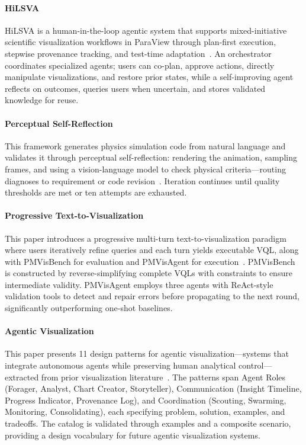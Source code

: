 \paragraph{HiLSVA}
HiLSVA is a human-in-the-loop agentic system that supports mixed-initiative scientific visualization workflows in ParaView through plan-first execution, stepwise provenance tracking, and test-time adaptation~\cite{avg260626614}. An orchestrator coordinates specialized agents; users can co-plan, approve actions, directly manipulate visualizations, and restore prior states, while a self-improving agent reflects on outcomes, queries users when uncertain, and stores validated knowledge for reuse.

\paragraph{Perceptual Self-Reflection}
This framework generates physics simulation code from natural language and validates it through perceptual self-reflection: rendering the animation, sampling frames, and using a vision-language model to check physical criteria—routing diagnoses to requirement or code revision~\cite{avg260212311}. Iteration continues until quality thresholds are met or ten attempts are exhausted. 

\paragraph{Progressive Text-to-Visualization}
This paper introduces a progressive multi-turn text-to-visualization paradigm where users iteratively refine queries and each turn yields executable VQL, along with PMVisBench for evaluation and PMVisAgent for execution~\cite{avg260529692}. PMVisBench is constructed by reverse-simplifying complete VQLs with constraints to ensure intermediate validity. PMVisAgent employs three agents with ReAct-style validation tools to detect and repair errors before propagating to the next round, significantly outperforming one-shot baselines.

\paragraph{Agentic Visualization}
This paper presents 11 design patterns for agentic visualization—systems that integrate autonomous agents while preserving human analytical control—extracted from prior visualization literature~\cite{avg250519101}. The patterns span Agent Roles (Forager, Analyst, Chart Creator, Storyteller), Communication (Insight Timeline, Progress Indicator, Provenance Log), and Coordination (Scouting, Swarming, Monitoring, Consolidating), each specifying problem, solution, examples, and tradeoffs. The catalog is validated through examples and a composite scenario, providing a design vocabulary for future agentic visualization systems.

